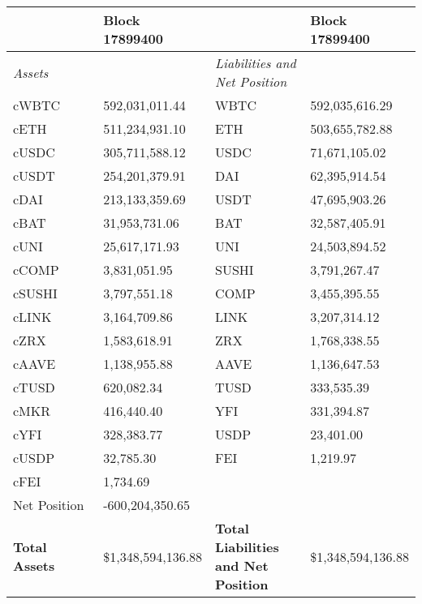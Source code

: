 
\begin{longtable}{@{}p{0.25\linewidth}p{0.25\linewidth}p{0.25\linewidth}p{0.25\linewidth}@{}}

\toprule


& Block 17899400 & & Block 17899400 \\

\midrule
\textit{Assets} & & \textit{Liabilities and Net Position} \\
cWBTC & 592,031,011.44 & WBTC &592,035,616.29 \\
cETH & 511,234,931.10 & ETH &503,655,782.88 \\
cUSDC & 305,711,588.12 & USDC &71,671,105.02 \\
cUSDT & 254,201,379.91 & DAI &62,395,914.54 \\
cDAI & 213,133,359.69 & USDT &47,695,903.26 \\
cBAT & 31,953,731.06 & BAT &32,587,405.91 \\
cUNI & 25,617,171.93 & UNI &24,503,894.52 \\
cCOMP & 3,831,051.95 & SUSHI &3,791,267.47 \\
cSUSHI & 3,797,551.18 & COMP &3,455,395.55 \\
cLINK & 3,164,709.86 & LINK &3,207,314.12 \\
cZRX & 1,583,618.91 & ZRX &1,768,338.55 \\
cAAVE & 1,138,955.88 & AAVE &1,136,647.53 \\
cTUSD & 620,082.34 & TUSD &333,535.39 \\
cMKR & 416,440.40 & YFI &331,394.87 \\
cYFI & 328,383.77 & USDP &23,401.00 \\
cUSDP & 32,785.30 & FEI &1,219.97 \\
cFEI & 1,734.69 & & \\
Net Position & -600,204,350.65 & & \\

\midrule

\textbf{Total Assets} & \$1,348,594,136.88 & \textbf{Total Liabilities and Net Position} & \$1,348,594,136.88 \\

\bottomrule

\end{longtable}
